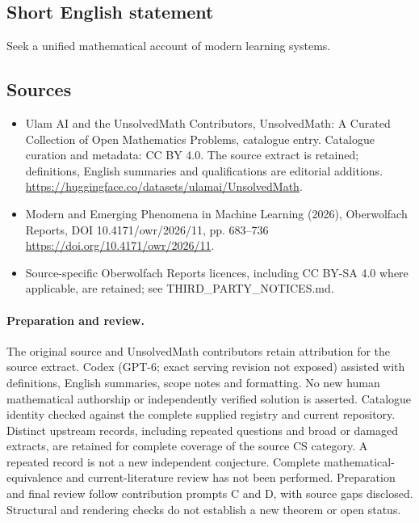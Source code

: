\documentclass[11pt]{article}
\begin{document}
\subsection{Short English statement}
Seek a unified mathematical account of modern learning systems.
\subsection{Sources}
\begin{itemize}
\item[\hypertarget{source:statement:1}{S1}] Ulam AI and the UnsolvedMath Contributors, UnsolvedMath: A Curated Collection of Open Mathematics Problems, catalogue entry. Catalogue curation and metadata: CC BY 4.0. The source extract is retained; definitions, English summaries and qualifications are editorial additions.
\url{https://huggingface.co/datasets/ulamai/UnsolvedMath}.
\item[\hypertarget{source:statement:2}{S2}] Modern and Emerging Phenomena in Machine Learning (2026), Oberwolfach Reports, DOI 10.4171/owr/2026/11, pp. 683--736
\url{https://doi.org/10.4171/owr/2026/11}.
\item Source-specific Oberwolfach Reports licences, including CC BY-SA 4.0 where applicable, are retained; see THIRD\_PARTY\_NOTICES.md.
\end{itemize}
\paragraph{Preparation and review.}
The original source and UnsolvedMath contributors retain attribution for the source extract. Codex (GPT-6; exact serving revision not exposed) assisted with definitions, English summaries, scope notes and formatting. No new human mathematical authorship or independently verified solution is asserted. Catalogue identity checked against the complete supplied registry and current repository. Distinct upstream records, including repeated questions and broad or damaged extracts, are retained for complete coverage of the source CS category. A repeated record is not a new independent conjecture. Complete mathematical-equivalence and current-literature review has not been performed. Preparation and final review follow contribution prompts C and D, with source gaps disclosed. Structural and rendering checks do not establish a new theorem or open status.
\label{end:statement}
\end{document}
